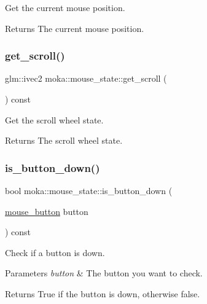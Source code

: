 Get the current mouse position. 

\begin{DoxyReturn}{Returns}
The current mouse position. 
\end{DoxyReturn}
\mbox{\label{classmoka_1_1mouse__state_a0bd1e8df67a32d04ba914d8f756087d2}} 
\subsubsection{\texorpdfstring{get\_scroll()}{get\_scroll()}}
{\footnotesize\ttfamily glm\+::ivec2 moka\+::mouse\+\_\+state\+::get\+\_\+scroll (\begin{DoxyParamCaption}{ }\end{DoxyParamCaption}) const}



Get the scroll wheel state. 

\begin{DoxyReturn}{Returns}
The scroll wheel state. 
\end{DoxyReturn}
\mbox{\label{classmoka_1_1mouse__state_ab8e986486e66977f9c1ff159c9a707cd}} 
\subsubsection{\texorpdfstring{is\_button\_down()}{is\_button\_down()}}
{\footnotesize\ttfamily bool moka\+::mouse\+\_\+state\+::is\+\_\+button\+\_\+down (\begin{DoxyParamCaption}\item[{\mbox{\hyperlink{namespacemoka_a6abad6bcde3e62228759441d067533a0}{mouse\+\_\+button}}}]{button }\end{DoxyParamCaption}) const}



Check if a button is down. 


\begin{DoxyParams}{Parameters}
{\em button} & The button you want to check. \\
\hline
\end{DoxyParams}
\begin{DoxyReturn}{Returns}
True if the button is down, otherwise false. 
\end{DoxyReturn}
\mbox{\label{classmoka_1_1mouse__state_a2ab33cf0358f5ff9912799d9fe625596}} 
